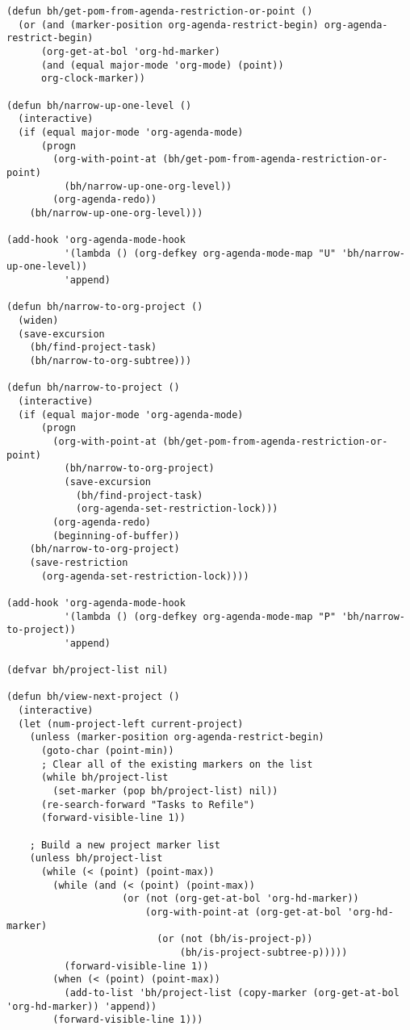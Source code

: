 \documentclass[11pt]{scrartcl}
\begin{document}
\begin{verbatim}
(defun bh/get-pom-from-agenda-restriction-or-point ()
  (or (and (marker-position org-agenda-restrict-begin) org-agenda-restrict-begin)
      (org-get-at-bol 'org-hd-marker)
      (and (equal major-mode 'org-mode) (point))
      org-clock-marker))

(defun bh/narrow-up-one-level ()
  (interactive)
  (if (equal major-mode 'org-agenda-mode)
      (progn
        (org-with-point-at (bh/get-pom-from-agenda-restriction-or-point)
          (bh/narrow-up-one-org-level))
        (org-agenda-redo))
    (bh/narrow-up-one-org-level)))

(add-hook 'org-agenda-mode-hook
          '(lambda () (org-defkey org-agenda-mode-map "U" 'bh/narrow-up-one-level))
          'append)

(defun bh/narrow-to-org-project ()
  (widen)
  (save-excursion
    (bh/find-project-task)
    (bh/narrow-to-org-subtree)))

(defun bh/narrow-to-project ()
  (interactive)
  (if (equal major-mode 'org-agenda-mode)
      (progn
        (org-with-point-at (bh/get-pom-from-agenda-restriction-or-point)
          (bh/narrow-to-org-project)
          (save-excursion
            (bh/find-project-task)
            (org-agenda-set-restriction-lock)))
        (org-agenda-redo)
        (beginning-of-buffer))
    (bh/narrow-to-org-project)
    (save-restriction
      (org-agenda-set-restriction-lock))))

(add-hook 'org-agenda-mode-hook
          '(lambda () (org-defkey org-agenda-mode-map "P" 'bh/narrow-to-project))
          'append)

(defvar bh/project-list nil)

(defun bh/view-next-project ()
  (interactive)
  (let (num-project-left current-project)
    (unless (marker-position org-agenda-restrict-begin)
      (goto-char (point-min))
      ; Clear all of the existing markers on the list
      (while bh/project-list
        (set-marker (pop bh/project-list) nil))
      (re-search-forward "Tasks to Refile")
      (forward-visible-line 1))

    ; Build a new project marker list
    (unless bh/project-list
      (while (< (point) (point-max))
        (while (and (< (point) (point-max))
                    (or (not (org-get-at-bol 'org-hd-marker))
                        (org-with-point-at (org-get-at-bol 'org-hd-marker)
                          (or (not (bh/is-project-p))
                              (bh/is-project-subtree-p)))))
          (forward-visible-line 1))
        (when (< (point) (point-max))
          (add-to-list 'bh/project-list (copy-marker (org-get-at-bol 'org-hd-marker)) 'append))
        (forward-visible-line 1)))


\end{verbatim}
\end{document}
